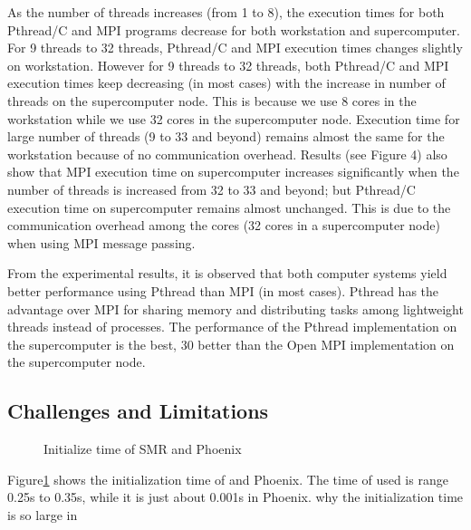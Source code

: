 As the number of threads increases (from 1 to 8), the
execution times for both Pthread/C and MPI programs decrease
for both workstation and supercomputer. For 9 threads to 32
threads, Pthread/C and MPI execution times changes slightly
on workstation. However for 9 threads to 32 threads, both
Pthread/C and MPI execution times keep decreasing (in most
cases) with the increase in number of threads on the
supercomputer node. This is because we use 8 cores in the
workstation while we use 32 cores in the supercomputer node.
Execution time for large number of threads (9 to 33 and
beyond) remains almost the same for the workstation because
of no communication overhead. Results (see Figure 4) also
show that MPI execution time on supercomputer increases
significantly when the number of threads is increased from 32
to 33 and beyond; but Pthread/C execution time on
supercomputer remains almost unchanged. This is due to the
communication overhead among the cores (32 cores in a
supercomputer node) when using MPI message passing.

From the
experimental results, it is observed that both computer systems
yield better performance using Pthread than MPI (in most
cases). Pthread has the advantage over MPI for sharing
memory and distributing tasks among lightweight threads
instead of processes. The performance of the Pthread
implementation on the supercomputer is the best, 30%
better than the Open MPI implementation on the
supercomputer node.

\subsection{ Challenges and Limitations}
\begin{figure}[htpb]
\centering
  \caption{Initialize time of SMR and Phoenix}
   \label{fig:init}
\end{figure}
Figure\ref{fig:init} shows the initialization time of \myds and Phoenix.
The time of \myds used is range 0.25s to  0.35s, 
while it is just about 0.001s in Phoenix.
{\color{red} why the initialization time is so large in \myds}


